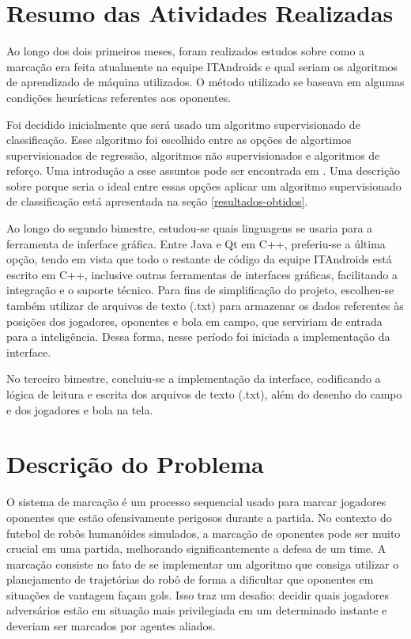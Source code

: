 \documentclass[a4paper,12pt]{article}
\begin{document}
\section{Resumo das Atividades Realizadas}
\label{secao:atividades_realizadas}

Ao longo dos dois primeiros meses, foram realizados estudos sobre como a marcação era feita atualmente na equipe ITAndroids e qual seriam os algoritmos de aprendizado de máquina utilizados. O método utilizado se baseava em algumas condições heurísticas referentes aos oponentes.

Foi decidido inicialmente que será usado um algoritmo supervisionado de classificação. Esse algoritmo foi escolhido entre as opções de algortimos supervisionados de regressão, algoritmos não supervisionados e algoritmos de reforço. Uma introdução a esse assuntos pode ser encontrada em \cite{alpaydin2009introduction}. Uma descrição sobre porque seria o ideal entre essas opções aplicar um algoritmo supervisionado de classificação está apresentada na seção \ref{resultados-obtidos}.

Ao longo do segundo bimestre, estudou-se quais linguagens se usaria para a ferramenta de inferface gráfica. Entre Java e Qt em C++, preferiu-se a última opção, tendo em vista que todo o restante de código da equipe ITAndroids está escrito em C++, inclusive outras ferramentas de interfaces gráficas, facilitando a integração e o suporte técnico. Para fins de simplificação do projeto, escolheu-se também utilizar de arquivos de texto (.txt) para armazenar os dados referentes às posições dos jogadores, oponentes e bola em campo, que serviriam de entrada para a inteligência. Dessa forma, nesse período foi iniciada a implementação da interface.

No terceiro bimestre, concluiu-se a implementação da interface, codificando a lógica de leitura e escrita dos arquivos de texto (.txt), além do desenho do campo e dos jogadores e bola na tela.

\section{Descrição do Problema}
\label{secao:enunciado_problema}

O sistema de marcação é um processo sequencial usado para marcar jogadores oponentes que estão ofensivamente perigosos durante a partida. No contexto do futebol de robôs humanóides simulados, a marcação de oponentes pode ser muito crucial em uma partida, melhorando significantemente a defesa de um time. A marcação consiste no fato de se implementar um algoritmo que consiga utilizar o planejamento de trajetórias do robô de forma a dificultar que oponentes em situações de vantagem façam gols. Isso traz um desafio: decidir quais jogadores adversários estão em situação mais privilegiada em um determinado instante e deveriam ser marcados por agentes aliados. 
\end{document}
